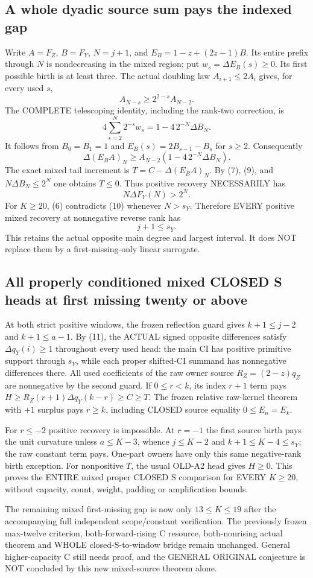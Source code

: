 \subsection{A whole dyadic source sum pays the indexed gap}
Write $A=F_Z$, $B=F_Y$, $N=j+1$, and
$E_B=1-z+(2z-1)B$. Its entire prefix through $N$ is nondecreasing
in the mixed region; put $w_s=\Delta E_B(s)\ge0$.
Its first possible birth is at least three. The actual doubling law
$A_{i+1}\le2A_i$ gives, for every used $s$,
\[
                       A_{N-s}\ge2^{2-s}A_{N-2}.
\]
The COMPLETE telescoping identity, including the rank-two correction, is
\[
 4\sum_{s=2}^N2^{-s}w_s
                   =1-4\,2^{-N}\Delta B_N.           \tag{8}
\]
It follows from $B_0=B_1=1$ and $E_B(s)=2B_{s-1}-B_s$ for $s\ge2$.
Consequently
\[
 \Delta(E_BA)_N\ge A_{N-2}(1-4\,2^{-N}\Delta B_N).    \tag{9}
\]
The exact mixed tail increment is $T=C-\Delta(E_BA)_N$.
By (7), (9), and $N\Delta B_N\le2^N$ one obtains $T\le0$.
Thus positive recovery NECESSARILY has
\[
                           N\Delta F_Y(N)>2^N.         \tag{10}
\]
For $K\ge20$, (6) contradicts (10) whenever $N>s_Y$.
Therefore EVERY positive mixed recovery at nonnegative reverse rank has
\[
                              j+1\le s_Y.             \tag{11}
\]
This retains the actual opposite main degree and largest interval.
It does NOT replace them by a first-missing-only linear surrogate.

\subsection{All properly conditioned mixed CLOSED S heads at first missing twenty or above}
At both strict positive windows, the frozen reflection guard gives
$k+1\le j-2$ and $k+1\le a-1$. By (11), the ACTUAL signed opposite
differences satisfy $\Delta q_Y(i)\ge1$ throughout every used head:
the main CI has positive primitive support through $s_Y$, while each
proper shifted-CI summand has nonnegative differences there.
All used coefficients of the raw owner source $R_Z=(2-z)q_Z$ are
nonnegative by the second guard. If $0\le r<k$, its index $r+1$ term
pays $H\ge R_Z(r+1)\Delta q_Y(k-r)\ge C\ge T$.
The frozen relative raw-kernel theorem with $+1$ surplus pays $r\ge k$,
including CLOSED source equality $0\le E_n=E_k$.

For $r\le-2$ positive recovery is impossible. At $r=-1$ the first
source birth pays the unit curvature unless $a\le K-3$, whence
$j\le K-2$ and $k+1\le K-4\le s_Y$; the raw constant term pays.
One-part owners have only this same negative-rank birth exception.
For nonpositive $T$, the usual OLD-A2 head gives $H\ge0$.
This proves the ENTIRE mixed proper CLOSED S comparison for EVERY
$K\ge20$, without capacity, count, weight, padding or amplification bounds.

The remaining mixed first-missing gap is now only $13\le K\le19$
after the accompanying full independent scope/constant verification. The previously frozen
max-twelve criterion, both-forward-rising C resource, both-nonrising
actual theorem and WHOLE closed-S-to-window bridge remain unchanged.
General higher-capacity C still needs proof, and the GENERAL ORIGINAL
conjecture is NOT concluded by this new mixed-source theorem alone.
